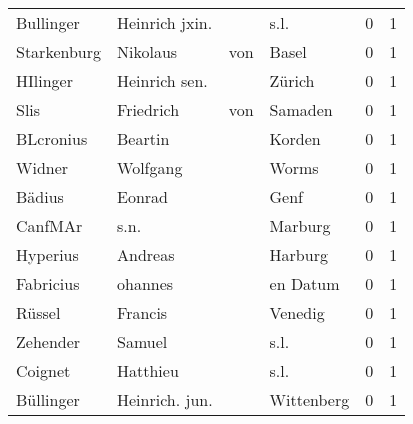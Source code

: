 \documentclass[10pt,a4paper,landscape]{article}
\begin{document}
\begin{longtable}{llllrr}
                Bullinger &                     Heinrich jxin. &             &                                        s.l. &          0 &         1 \\
              Starkenburg &                           Nikolaus &         von &                                       Basel &          0 &         1 \\
                 HIlinger &                      Heinrich sen. &             &                                      Zürich &          0 &         1 \\
                     Slis &                          Friedrich &         von &                                     Samaden &          0 &         1 \\
                BLcronius &                            Beartin &             &                                      Korden &          0 &         1 \\
                   Widner &                           Wolfgang &             &                                       Worms &          0 &         1 \\
                   Bädius &                             Eonrad &             &                                        Genf &          0 &         1 \\
                  CanfMAr &                               s.n. &             &                                     Marburg &          0 &         1 \\
                 Hyperius &                            Andreas &             &                                     Harburg &          0 &         1 \\
                Fabricius &                            ohannes &             &                                    en Datum &          0 &         1 \\
                   Rüssel &                            Francis &             &                                     Venedig &          0 &         1 \\
                 Zehender &                             Samuel &             &                                        s.l. &          0 &         1 \\
                  Coignet &                           Hatthieu &             &                                        s.l. &          0 &         1 \\
                Büllinger &                     Heinrich. jun. &             &                                  Wittenberg &          0 &         1 \\

\end{longtable}
\end{document}
